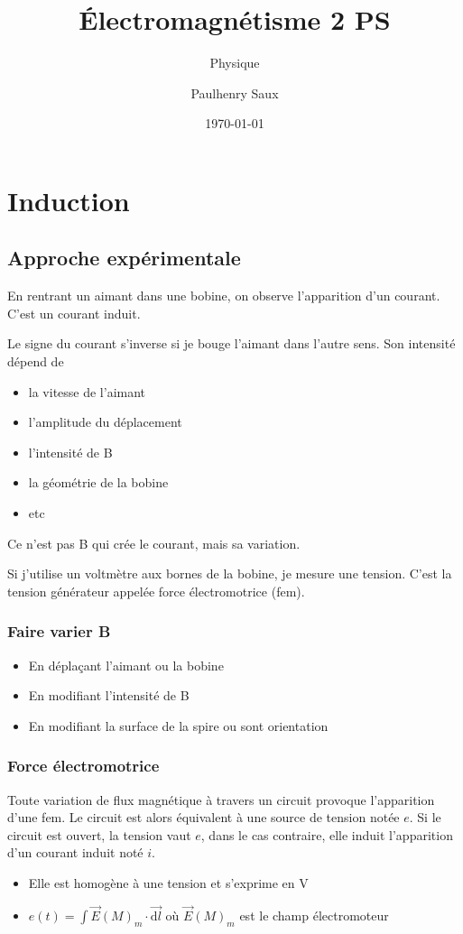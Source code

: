 \documentclass[french]{yLectureNote}
\title{Électromagnétisme 2 PS}
\subtitle{Physique}
\author{Paulhenry Saux}
\date{\today}
\renewcommand{\vec}{\overrightarrow}
\newcommand{\dd}{\mathrm{d}}
\newcommand{\E}{\vec{E}(M)}
\begin{document}
\chapter{Induction}
\section{Approche expérimentale}
En rentrant un aimant dans une bobine, on observe l'apparition d'un courant. C'est un courant induit.

Le signe du courant s'inverse si je bouge l'aimant dans l'autre sens. Son intensité dépend de 
\begin{itemize}
    \item la vitesse de l'aimant
    \item l'amplitude du déplacement
    \item l'intensité de B
    \item la géométrie de la bobine
    \item etc
\end{itemize}
Ce n'est pas B qui crée le courant, mais sa variation.

Si j'utilise un voltmètre aux bornes de la bobine, je mesure une tension. C'est la tension générateur appelée force électromotrice (fem).

\subsection{Faire varier B}
\begin{itemize}
    \item En déplaçant l'aimant ou la bobine
    \item En modifiant l'intensité de B
    \item En modifiant la surface de la spire ou sont orientation
\end{itemize}
\subsection{Force électromotrice}
\begin{definition}
    Toute variation de flux magnétique à travers un circuit provoque l'apparition d'une fem. Le circuit est alors équivalent à
    une source de tension notée $e$. Si le circuit est ouvert, la tension vaut $e$, dans le cas contraire, elle induit l'apparition d'un courant induit noté $i$.
\end{definition}
\begin{itemize}
    \item Elle est homogène à une tension et s'exprime en V 
    \item $e(t) = \int \E_m\cdot \vec{\dd l}$ où $\E_m$ est le champ électromoteur
\end{itemize}
\end{document}
